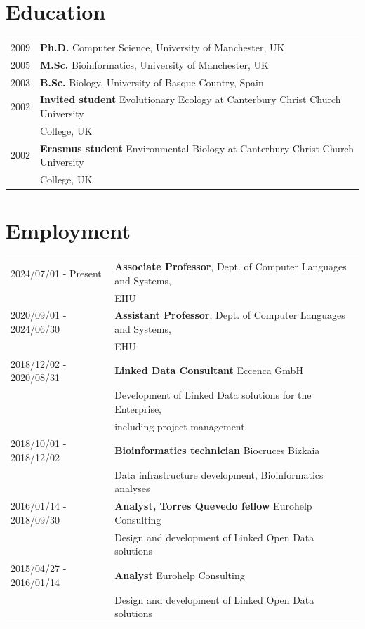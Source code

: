 \documentclass[11pt,fullpage]{article}
\begin{document}

\section*{Education}

\begin{tabular}{ll}
	2009 & {\bf Ph.D.} Computer Science, University of Manchester, UK \\
	2005 & {\bf M.Sc.} Bioinformatics, University of Manchester, UK \\
	2003 & {\bf B.Sc.} Biology, University of Basque Country, Spain \\
	2002 & {\bf Invited student} Evolutionary Ecology at Canterbury Christ Church University \\
	     & College, UK \\
	2002 & {\bf Erasmus student} Environmental Biology at Canterbury Christ Church University \\
	     & College, UK \\
\end{tabular}

\section*{Employment}


\begin{tabular}{ll}
2024/07/01 - Present & {\bf Associate Professor}, Dept. of Computer Languages and Systems, \\
  & EHU \\
2020/09/01 - 2024/06/30 & {\bf Assistant Professor}, Dept. of Computer Languages and Systems, \\
  & EHU \\
2018/12/02 - 2020/08/31 & {\bf Linked Data Consultant} Eccenca GmbH \\
      & Development of Linked Data solutions for the Enterprise, \\ 
      & including project management\\
2018/10/01 - 2018/12/02 & {\bf Bioinformatics technician} Biocruces Bizkaia \\
      & Data infrastructure development, Bioinformatics analyses \\
2016/01/14 - 2018/09/30 & {\bf Analyst, Torres Quevedo fellow} Eurohelp Consulting \\
	      & Design and development of Linked Open Data solutions\\
 2015/04/27 -  2016/01/14 & {\bf Analyst} Eurohelp Consulting \\
	    & Design and development of Linked Open Data solutions\\
\end{tabular}
\end{document}
